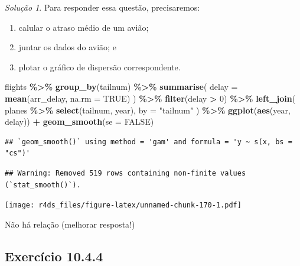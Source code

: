 \documentclass[
]{latex/krantz}
\newenvironment{Shaded}{\begin{snugshade}}{\end{snugshade}}
\newcommand{\AttributeTok}[1]{\textcolor[rgb]{0.13,0.29,0.53}{#1}}
\newcommand{\ConstantTok}[1]{\textcolor[rgb]{0.56,0.35,0.01}{#1}}
\newcommand{\DecValTok}[1]{\textcolor[rgb]{0.00,0.00,0.81}{#1}}
\newcommand{\FunctionTok}[1]{\textcolor[rgb]{0.13,0.29,0.53}{\textbf{#1}}}
\newcommand{\NormalTok}[1]{#1}
\newcommand{\SpecialCharTok}[1]{\textcolor[rgb]{0.81,0.36,0.00}{\textbf{#1}}}
\newcommand{\StringTok}[1]{\textcolor[rgb]{0.31,0.60,0.02}{#1}}
\providecommand{\tightlist}{%
  \setlength{\itemsep}{0pt}\setlength{\parskip}{0pt}}
\theoremstyle{definition}
\theoremstyle{definition}
\theoremstyle{definition}
\theoremstyle{definition}
\theoremstyle{remark}
\newtheorem*{solution}{Solução}
\begin{document}
\begin{solution}
Para responder essa questão, precisaremos:

\begin{enumerate}
\def\labelenumi{\arabic{enumi}.}
\tightlist
\item
  calular o atraso médio de um avião;
\item
  juntar os dados do avião; e
\item
  plotar o gráfico de dispersão correspondente.
\end{enumerate}

\begin{Shaded}
\begin{Highlighting}[]
\NormalTok{flights }\SpecialCharTok{\%\textgreater{}\%}
  \FunctionTok{group\_by}\NormalTok{(tailnum) }\SpecialCharTok{\%\textgreater{}\%}
  \FunctionTok{summarise}\NormalTok{(}
    \AttributeTok{delay =} \FunctionTok{mean}\NormalTok{(arr\_delay, }\AttributeTok{na.rm =} \ConstantTok{TRUE}\NormalTok{)}
\NormalTok{  ) }\SpecialCharTok{\%\textgreater{}\%}
  \FunctionTok{filter}\NormalTok{(delay }\SpecialCharTok{\textgreater{}} \DecValTok{0}\NormalTok{) }\SpecialCharTok{\%\textgreater{}\%}
  \FunctionTok{left\_join}\NormalTok{(}
\NormalTok{    planes }\SpecialCharTok{\%\textgreater{}\%} 
      \FunctionTok{select}\NormalTok{(tailnum, year), }
    \AttributeTok{by =} \StringTok{"tailnum"}
\NormalTok{  ) }\SpecialCharTok{\%\textgreater{}\%}
  \FunctionTok{ggplot}\NormalTok{(}\FunctionTok{aes}\NormalTok{(year, delay)) }\SpecialCharTok{+}
    \FunctionTok{geom\_smooth}\NormalTok{(}\AttributeTok{se =} \ConstantTok{FALSE}\NormalTok{)}
\end{Highlighting}
\end{Shaded}

\begin{verbatim}
## `geom_smooth()` using method = 'gam' and formula = 'y ~ s(x, bs = "cs")'
\end{verbatim}

\begin{verbatim}
## Warning: Removed 519 rows containing non-finite values (`stat_smooth()`).
\end{verbatim}

\texttt{[image: r4ds\_files/figure-latex/unnamed-chunk-170-1.pdf]}

Não há relação (melhorar resposta!)
\end{solution}

\hypertarget{exr10-4-4}{%
\subsection*{Exercício 10.4.4}\label{exr10-4-4}}
\end{document}
